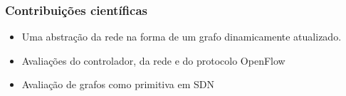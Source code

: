 %
%
\begin{frame}\frametitle{Contribuições científicas}
    \begin{itemize}
        \setlength{\itemsep}{1cm}
        \item Uma abstração da rede na forma de um grafo dinamicamente 
            atualizado.
        \item Avaliações do controlador, da rede e do protocolo OpenFlow
        \item Avaliação de grafos como primitiva em SDN
    \end{itemize}
\end{frame}
